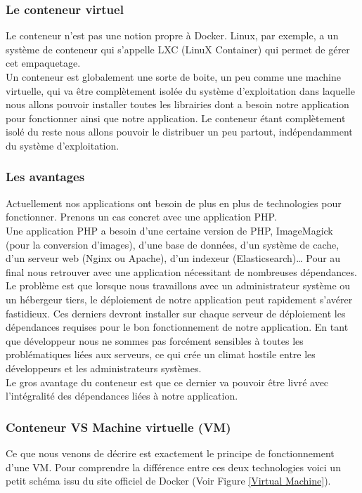       \subsubsection{Le conteneur virtuel}
      Le conteneur n’est pas une notion propre à Docker. Linux, par exemple, a un système de conteneur qui s’appelle \gls{LXC} (LinuX Container) qui permet de gérer cet empaquetage.\\

      Un conteneur est globalement une sorte de boite, un peu comme une machine virtuelle, qui va être complètement isolée du système d’exploitation dans laquelle nous allons pouvoir installer toutes les librairies dont a besoin notre application pour fonctionner ainsi que notre application. Le conteneur étant complètement isolé du reste nous allons pouvoir le distribuer un peu partout, indépendamment du système d’exploitation.

      \subsubsection{Les avantages}
      Actuellement nos applications ont besoin de plus en plus de technologies pour fonctionner. Prenons un cas concret avec une application PHP.\\

      Une application PHP a besoin d’une certaine version de PHP, ImageMagick (pour la conversion d’images), d’une base de données, d’un système de cache, d’un serveur web (Nginx ou Apache), d’un indexeur (Elasticsearch)… Pour au final nous retrouver avec une application nécessitant de nombreuses dépendances.\\

      Le problème est que lorsque nous travaillons avec un administrateur système ou un hébergeur tiers, le déploiement de notre application peut rapidement s’avérer fastidieux. Ces derniers devront installer sur chaque serveur de déploiement les dépendances requises pour le bon fonctionnement de notre application. En tant que développeur nous ne sommes pas forcément sensibles à toutes les problématiques liées aux serveurs, ce qui crée un climat hostile entre les développeurs et les administrateurs systèmes.\\

      Le gros avantage du conteneur est que ce dernier va pouvoir être livré avec l’intégralité des dépendances liées à notre application.

      \subsubsection{Conteneur VS Machine virtuelle (VM)}
      Ce que nous venons de décrire est exactement le principe de fonctionnement d’une \gls{VM}. Pour comprendre la différence entre ces deux technologies voici un petit schéma issu du site officiel de Docker (Voir Figure \ref{Virtual Machine}).\\

